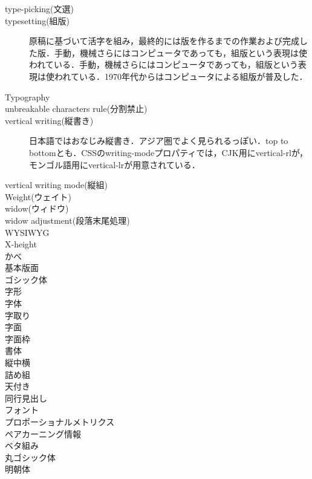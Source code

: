 \begin{description}
    \item[type-picking(文選)]
    \item[typesetting(組版)] 原稿に基づいて活字を組み，最終的には版を作るまでの作業および完成した版．手動，機械さらにはコンピュータであっても，組版という表現は使われている．手動，機械さらにはコンピュータであっても，組版という表現は使われている\cite{lis_dictionary}．1970年代からはコンピュータによる組版が普及した\cite{www.printing-museum.org:communication/column/pdf/column_6.pdf}．
    \item[Typography]
    \item[unbreakable characters rule(分割禁止)]
    \item[vertical writing(縦書き)] 日本語ではおなじみ縦書き．アジア圏でよく見られるっぽい．top to bottomとも\cite{eikaiwa.dmm.com:uknow/questions/29852/}\cite{www.w3.org:International/questions/qa-scripts}．CSSの{\sf writing-mode}プロパティでは，CJK用に{\sf vertical-rl}が，モンゴル語用に{\sf vertical-lr}が用意されている\cite{www.w3.org:International/articles/vertical-text/}．
    \item[vertical writing mode(縦組)]
    \item[Weight(ウェイト)]
    \item[widow(ウィドウ)]
    \item[widow adjustment(段落末尾処理)]
    \item[WYSIWYG]
    \item[X-height]
    \item[かべ]
    \item[基本版面]
    \item[ゴシック体]
    \item[字形]
    \item[字体]
    \item[字取り]
    \item[字面]
    \item[字面枠]
    \item[書体]
    \item[縦中横]
    \item[詰め組]
    \item[天付き]
    \item[同行見出し]
    \item[フォント]
    \item[プロポーショナルメトリクス]
    \item[ペアカーニング情報]
    \item[ベタ組み]
    \item[丸ゴシック体]
    \item[明朝体]
\end{description}


